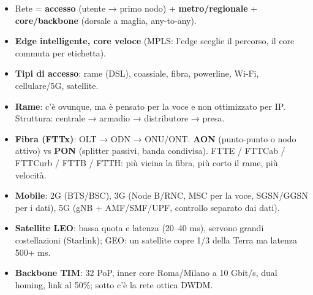 \begin{itemize}
\tightlist
\item
  Rete = \textbf{accesso} (utente → primo nodo) + \textbf{metro/regionale} + \textbf{core/backbone} (dorsale a maglia, any-to-any).
\item
  \textbf{Edge intelligente, core veloce} (MPLS: l'edge sceglie il percorso, il core commuta per etichetta).
\item
  \textbf{Tipi di accesso}: rame (DSL), coassiale, fibra, powerline, Wi-Fi, cellulare/5G, satellite.
\item
  \textbf{Rame}: c'è ovunque, ma è pensato per la voce e non ottimizzato per IP. Struttura: centrale → armadio → distributore → presa.
\item
  \textbf{Fibra (FTTx)}: OLT → ODN → ONU/ONT. \textbf{AON} (punto-punto o nodo attivo) vs \textbf{PON} (splitter passivi, banda condivisa). FTTE / FTTCab / FTTCurb / FTTB / FTTH: più vicina la fibra, più corto il rame, più velocità.
\item
  \textbf{Mobile}: 2G (BTS/BSC), 3G (Node B/RNC, MSC per la voce, SGSN/GGSN per i dati), 5G (gNB + AMF/SMF/UPF, controllo separato dai dati).
\item
  \textbf{Satellite LEO}: bassa quota e latenza (20--40 ms), servono grandi costellazioni (Starlink); GEO: un satellite copre 1/3 della Terra ma latenza 500+ ms.
\item
  \textbf{Backbone TIM}: 32 PoP, inner core Roma/Milano a 10 Gbit/s, dual homing, link al 50\%; sotto c'è la rete ottica DWDM.
\end{itemize}
